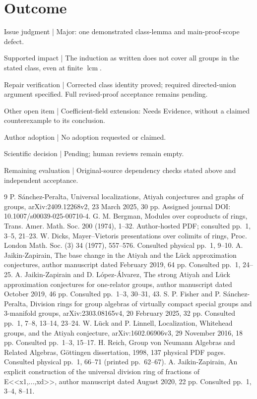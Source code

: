 \documentclass[10pt]{article}
\begin{document}
\section*{Outcome}
Issue judgment | Major: one demonstrated class-lemma and main-proof-scope defect.\par
Supported impact | The induction as written does not cover all groups in the stated class, even at finite \(\operatorname{lcm}\).\par
Repair verification | Corrected class identity proved; required directed-union argument specified. Full revised-proof acceptance remains pending.\par
Other open item | Coefficient-field extension: Needs Evidence, without a claimed counterexample to its conclusion.\par
Author adoption | No adoption requested or claimed.\par
Scientific decision | Pending; human reviews remain empty.\par
Remaining evaluation | Original-source dependency checks stated above and independent acceptance.\par
9 P. Sánchez-Peralta, Universal localizations, Atiyah conjectures and graphs of groups, arXiv:2409.12268v2, 23 March 2025, 30 pp. Assigned journal DOI: 10.1007/s00039-025-00710-4. G. M. Bergman, Modules over coproducts of rings, Trans. Amer. Math. Soc. 200 (1974), 1–32. Author-hosted PDF; consulted pp. 1, 3–5, 21–23. W. Dicks, Mayer–Vietoris presentations over colimits of rings, Proc. London Math. Soc. (3) 34 (1977), 557–576. Consulted physical pp. 1, 9–10. A. Jaikin-Zapirain, The base change in the Atiyah and the Lück approximation conjectures, author manuscript dated February 2019, 64 pp. Consulted pp. 1, 24–25. A. Jaikin-Zapirain and D. López-Álvarez, The strong Atiyah and Lück approximation conjectures for one-relator groups, author manuscript dated October 2019, 46 pp. Consulted pp. 1–3, 30–31, 43. S. P. Fisher and P. Sánchez-Peralta, Division rings for group algebras of virtually compact special groups and 3-manifold groups, arXiv:2303.08165v4, 20 February 2025, 32 pp. Consulted pp. 1, 7–8, 13–14, 23–24. W. Lück and P. Linnell, Localization, Whitehead groups, and the Atiyah conjecture, arXiv:1602.06906v3, 29 November 2016, 18 pp. Consulted pp. 1–3, 15–17. H. Reich, Group von Neumann Algebras and Related Algebras, Göttingen dissertation, 1998, 137 physical PDF pages. Consulted physical pp. 1, 66–71 (printed pp. 62–67). A. Jaikin-Zapirain, An explicit construction of the universal division ring of fractions of E<<x1,...,xd>>, author manuscript dated August 2020, 22 pp. Consulted pp. 1, 3–4, 8–11.\par
\end{document}
